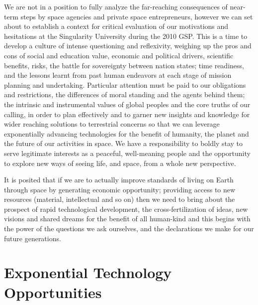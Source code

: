 \documentclass[letter,11pt]{article}
\begin{document}
We are not in a position to fully analyze the far-reaching consequences of
near-term steps by space agencies and private space entrepreneurs, however we
can set about to establish a  context for critical evaluation of our
motivations and hesitations at the Singularity University during the 2010 GSP.
This is a time to develop a culture of intense questioning and reflexivity,
weighing up the pros and cons of social and education value, economic and
political drivers, scientific benefits, risks, the battle for sovereignty
between nation states; time readiness, and the lessons learnt from past human
endeavors at each stage of mission  planning and undertaking. Particular
attention must be paid to our obligations and restrictions, the differences of
moral standing and the agents behind them; the intrinsic and instrumental
values of global peoples and the core truths of our calling, in order to plan
effectively and to garner new insights and knowledge for wider reaching
solutions to terrestrial concerns so that we can leverage exponentially
advancing technologies for the benefit of humanity, the planet and the future
of our activities in space. We have a responsibility to boldly stay to serve
legitimate interests as a peaceful, well-meaning people and the opportunity to
explore new ways of seeing life, and space, from a whole new perspective. 

It is posited that if we are to actually improve standards of living on Earth
through space by  generating economic opportunity; providing access to new
resources (material, intellectual and so on) then we need to bring about the
prospect of rapid technological development, the cross-fertilization of ideas,
new visions and shared dreams for the benefit of all human-kind and this begins
with the power of the questions we ask ourselves, and the declarations we make
for our future generations. 




\section{Exponential Technology Opportunities}
\end{document}

